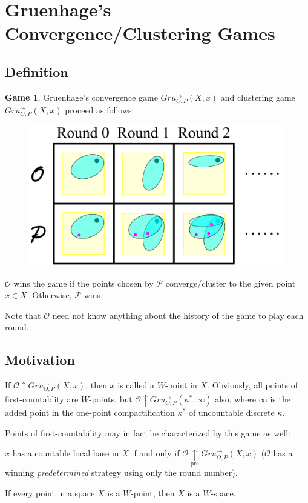 \documentclass{beamer}
\theoremstyle{definition}
\newtheorem{game}[theorem]{Game}
\newcommand{\win}{\uparrow}
\newcommand{\prewin}{\underset{\text{pre}}{\uparrow}}
\newcommand{\oneptcomp}[1]{#1^*}
\newcommand{\gruConGame}[2]{Gru_{O,P}^{\to}\left({#1},{#2}\right)}
\newcommand{\gruClusGame}[2]{Gru_{O,P}^{\leadsto}\left({#1},{#2}\right)}
\newcommand{\<}{\langle}
\renewcommand{\>}{\rangle}
\newcommand{\pl}[1]{\mathscr{#1}}
\newcommand{\term}{\textit}
\begin{document}
\section{Gruenhage's Convergence/Clustering Games}

\subsection{Definition}

\begin{frame}
  \small
  \begin{game}
  Gruenhage's convergence game $\gruConGame{X}{x}$
  and clustering game $\gruClusGame{X}{x}$ proceed as follows:
    \begin{figure}
      \includegraphics[width=0.6\linewidth]{convergenceGame.pdf}
    \end{figure}

  $\pl O$ wins the game if the points chosen by $\pl P$ converge/cluster
  to the given point $x\in X$. Otherwise, $\pl P$ wins.
  \end{game}

  \tiny
  Note that $\pl O$ need not know anything about the history of the game
  to play each round.
\end{frame}

\subsection{Motivation}

\begin{frame}
  If $\pl O\win \gruConGame{X}{x}$, then $x$ is called a $W$-point in $X$.
  Obviously, all points of first-countablity are $W$-points, but
  $\pl O\win\gruConGame{\oneptcomp\kappa}{\infty}$ also, where $\infty$
  is the added point in the one-point compactification $\oneptcomp\kappa$
  of uncountable discrete $\kappa$.

  \vpause

  Points of first-countability may in fact be characterized by this game
  as well:
  \begin{theorem}
    $x$ has a countable local base in $X$ if and only if
    $\pl O\prewin \gruConGame{X}{x}$ ($\pl O$ has
    a winning \term{predetermined}
    strategy using only the round number).
  \end{theorem}

  \pause

  If every point in a space $X$ is a $W$-point, then $X$ is a $W$-space.
\end{frame}
\end{document}
